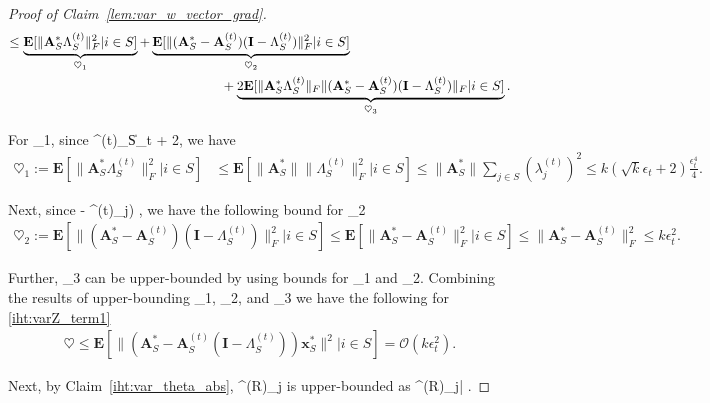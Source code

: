 \documentclass{article}
\newcommand{\siri}[1]{{\color{black}{#1}}}
\def\[#1\]{{$#1$}}
\def\b#1{{\mathbf{#1}}}
\begin{document}
\begin{proof}[Proof of Claim~\ref{lem:var_w_vector_grad}]
\begin{align}
	
	
	\leq \underbrace{\b{E}[\| \b{A}^*_S\Lambda^{(t)}_S\|^2_F|i\in S]}_{\heartsuit_1} + &\underbrace{\b{E}[\|(\b{A}^*_S - \b{A}^{(t)}_S)(\b{I} - \Lambda^{(t)}_S)\|^2_F|i\in S]}_{\heartsuit_2} \notag\\
	&~~~~~~~~~~~~~~~~+ \underbrace{2\b{E}[\| \b{A}^*_S\Lambda^{(t)}_S\|_F\|(\b{A}^*_S - \b{A}^{(t)}_S)(\b{I} - \Lambda^{(t)}_S)\|_F|i\in S]}_{\heartsuit_3}.
	\end{align}
	
	For \[\heartsuit_1\], since \[ \|\b{A}^{(t)}_S\| \leq {}\epsilon_t + 2\], we have
	\begin{align*}
	\heartsuit_1:=\b{E}[\| \b{A}^*_S\Lambda^{(t)}_S\|^2_F|i\in S] &\leq \b{E}[\|\b{A}^*_S\|\|\Lambda^{(t)}_S\|^2_F|i\in S]
	

	 \leq \|\b{A}^*_S\|\textstyle\sum_{j\in S} (\lambda^{(t)}_j)^2 
	\leq  k(\sqrt{k}\epsilon_t + 2)\tfrac{\epsilon_t^4}{4}.
	\end{align*}
	







	Next, since \[(1 - \lambda^{(t)}_j) \], we have the following bound for \[\heartsuit_2\]
	\begin{align*}
	\heartsuit_2 := \b{E}[\|(\b{A}^*_S - \b{A}^{(t)}_S)(\b{I} - \Lambda^{(t)}_S)\|^2_F|i\in S] \leq \b{E}[\|\b{A}^*_S - \b{A}^{(t)}_S\|^2_F|i\in S] \leq \|\b{A}^*_S - \b{A}^{(t)}_S\|^2_F \leq k\epsilon_t^2.
	\end{align*}
	







	
	
	
	
	
	
	
	Further, \[\heartsuit_3\] can be upper-bounded by using bounds for \[\heartsuit_1\] and \[\heartsuit_2\]. Combining the results of upper-bounding \[\heartsuit_1\], \[\heartsuit_2\], and \[\heartsuit_3\] we have the following for \eqref{iht:varZ_term1}
	\begin{align*}
	\heartsuit \leq \b{E}[\|( \b{A}^*_S- \b{A}^{(t)}_S(\b{I} - \Lambda^{(t)}_S))\b{x}^*_S \|^2|i\in S] = \mathcal{O}(k\epsilon_t^2).
	\end{align*}
	

    Next, by Claim~\ref{iht:var_theta_abs}, \[\vartheta^{(R)}_j\] is upper-bounded as \[	|\vartheta^{(R)}_{j}|  \leq  \siri{\mathcal{O}(t_{\beta})}.\]














\end{proof}
\end{document}
